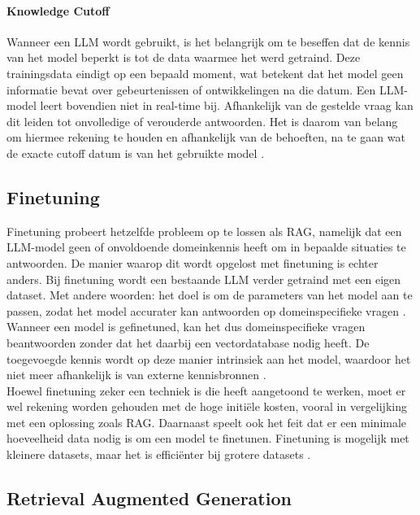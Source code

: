\paragraph{Knowledge Cutoff}

Wanneer een LLM wordt gebruikt, is het belangrijk om te beseffen dat de kennis van het model beperkt is tot de data waarmee het werd getraind. Deze trainingsdata eindigt op een bepaald moment, wat betekent dat het model geen informatie bevat over gebeurtenissen of ontwikkelingen na die datum. Een LLM-model leert bovendien niet in real-time bij. Afhankelijk van de gestelde vraag kan dit leiden tot onvolledige of verouderde antwoorden. Het is daarom van belang om hiermee rekening te houden en afhankelijk van de behoeften, na te gaan wat de exacte cutoff datum is van het gebruikte model \autocite{Hadi2023}.
 
\subsection{Finetuning}
 
Finetuning probeert hetzelfde probleem op te lossen als RAG, namelijk dat een LLM-model geen of onvoldoende domeinkennis heeft om in bepaalde situaties te antwoorden. De manier waarop dit wordt opgelost met finetuning is echter anders. Bij finetuning wordt een bestaande LLM verder getraind met een eigen dataset. Met andere woorden: het doel is om de parameters van het model aan te passen, zodat het model accurater kan antwoorden op domeinspecifieke vragen \autocite{Raj2024}.
\\[1em]
Wanneer een model is gefinetuned, kan het dus domeinspecifieke vragen beantwoorden zonder dat het daarbij een vectordatabase nodig heeft. De toegevoegde kennis wordt op deze manier intrinsiek aan het model, waardoor het niet meer afhankelijk is van externe kennisbronnen \autocite{Raj2024}.
\\[1em]
Hoewel finetuning zeker een techniek is die heeft aangetoond te werken, moet er wel rekening worden gehouden met de hoge initiële kosten, vooral in vergelijking met een oplossing zoals RAG. Daarnaast speelt ook het feit dat er een minimale hoeveelheid data nodig is om een model te finetunen. Finetuning is mogelijk met kleinere datasets, maar het is efficiënter bij grotere datasets \autocite{Balaguer2024}.

 
\subsection{Retrieval Augmented Generation}

